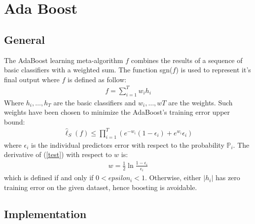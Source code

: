 
\chapter{Ada Boost}
\section{General}
	The AdaBoost learning meta-algorithm $f$ combines the results of a sequence of basic classifiers with a weighted sum. The function sgn($f$) is used to represent it's final output where $f$ is defined as follow:
	\begin{align*}
		f = \sum_{i=1}^{T}w_{i}h_{i}
	\end{align*}
	Where $h_{i}, \dots, h_{T}$ are the basic classifiers and $w_{i}, \dots, w{T}$ are the weights. Such weights have been chosen to minimize the AdaBoost's training error upper bound:
	\begin{align}
		\hat{\ell}_{S}(f) \leq \prod_{i=1}^{T}(e^{-w_{i}}(1-\epsilon_{i})+e^{w_{i}}\epsilon_{i})
		\label{test}
	\end{align}
	where $\epsilon_{i}$ is the individual predictors error with respect to the probability $\mathbb{P}_{i}$. The derivative of (\ref{test}) with respect to $w$ is:
	\begin{align*}
		w = \frac{1}{2}\ln\frac{1-\epsilon_{i}}{\epsilon_{i}}
	\end{align*}
	which is defined if and only if $0 < epsilon_{i} < 1$. Otherwise, either $|h_{i}|$ has zero training error on the given dataset, hence boosting is avoidable. 
\section{Implementation}